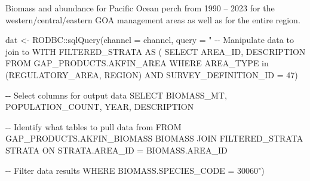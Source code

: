 \documentclass[
  letterpaper,
  oneside,
  open=any]{scrbook}
\newenvironment{Shaded}{\begin{snugshade}}{\end{snugshade}}
\newcommand{\AttributeTok}[1]{\textcolor[rgb]{0.40,0.45,0.13}{#1}}
\newcommand{\FunctionTok}[1]{\textcolor[rgb]{0.28,0.35,0.67}{#1}}
\newcommand{\NormalTok}[1]{\textcolor[rgb]{0.00,0.23,0.31}{#1}}
\newcommand{\OtherTok}[1]{\textcolor[rgb]{0.00,0.23,0.31}{#1}}
\newcommand{\SpecialCharTok}[1]{\textcolor[rgb]{0.37,0.37,0.37}{#1}}
\newcommand{\StringTok}[1]{\textcolor[rgb]{0.13,0.47,0.30}{#1}}
\begin{document}
Biomass and abundance for Pacific Ocean perch from 1990 -- 2023 for the
western/central/eastern GOA management areas as well as for the entire
region.

\begin{Shaded}
\begin{Highlighting}[]
\NormalTok{dat }\OtherTok{\textless{}{-}}\NormalTok{ RODBC}\SpecialCharTok{::}\FunctionTok{sqlQuery}\NormalTok{(}\AttributeTok{channel =}\NormalTok{ channel, }
                       \AttributeTok{query =} 
                         \StringTok{"}
\StringTok{{-}{-} Manipulate data to join to}
\StringTok{WITH FILTERED\_STRATA AS (}
\StringTok{SELECT AREA\_ID, DESCRIPTION FROM GAP\_PRODUCTS.AKFIN\_AREA}
\StringTok{WHERE AREA\_TYPE in (\textquotesingle{}REGULATORY\_AREA\textquotesingle{}, \textquotesingle{}REGION\textquotesingle{}) }
\StringTok{AND SURVEY\_DEFINITION\_ID = 47)}

\StringTok{{-}{-} Select columns for output data}
\StringTok{SELECT }
\StringTok{BIOMASS\_MT,}
\StringTok{POPULATION\_COUNT, }
\StringTok{YEAR, }
\StringTok{DESCRIPTION}

\StringTok{{-}{-} Identify what tables to pull data from}
\StringTok{FROM GAP\_PRODUCTS.AKFIN\_BIOMASS BIOMASS}
\StringTok{JOIN FILTERED\_STRATA STRATA }
\StringTok{ON STRATA.AREA\_ID = BIOMASS.AREA\_ID}

\StringTok{{-}{-} Filter data results}
\StringTok{WHERE BIOMASS.SPECIES\_CODE = 30060"}\NormalTok{)}
\end{Highlighting}
\end{Shaded}
\end{document}
